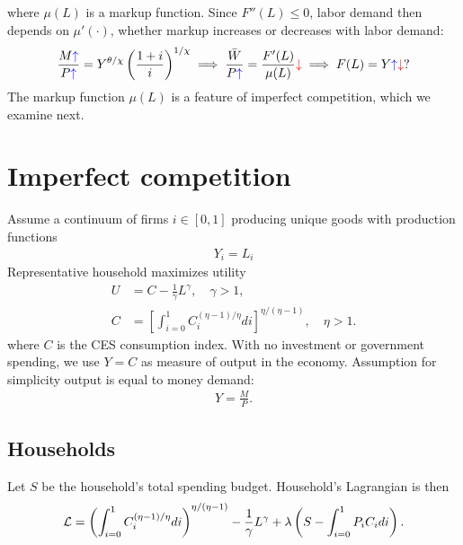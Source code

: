 \documentclass[../main.tex]{subfiles}
\begin{document}
        where $\mu(L)$ is a markup function. Since $F''(L) \le 0$, labor demand then depends on $\mu'(\cdot)$, whether markup increases or decreases with labor demand:
        \begin{align}
            \frac{M \textcolor{blue}{\uparrow}}{P \textcolor{blue}{\uparrow}} = Y^{\theta/\chi} \left(\frac{1+i}{i}\right)^{1/\chi}
            \implies
            \frac{\bar W}{P \textcolor{blue}{\uparrow}}
            = \frac{F'(L)}{\mu(L)} \textcolor{red}{\downarrow}
            \implies
            F(L) = Y \textcolor{blue}{\uparrow} \textcolor{red}{\downarrow} ?
        \end{align}
        The markup function $\mu(L)$ is a feature of imperfect competition, which we examine next.
        
    
    \section{Imperfect competition}
        
        Assume a continuum of firms $i \in [0, 1]$ producing unique goods with production functions
        \begin{align}
            Y_{i} = L_{i}
            \label{eqn:imperfect-prod-fn}
        \end{align}
        Representative household maximizes utility
        \begin{align}
            U &= C - \frac{1}{\gamma} L^{\gamma}, \quad \gamma > 1,
            \\
            C &= \left[
                \int_{i=0}^1 C_i^{(\eta - 1)/\eta} di
            \right]^{\eta / (\eta - 1)},
            \quad \eta > 1.
            \label{eqn:impcomp-consumption-utility}
        \end{align}
        where $C$ is the CES consumption index. With no investment or government spending, we use $Y = C$ as measure of output in the economy. Assumption for simplicity output is equal to money demand:
        \begin{align}
            Y = \frac{M}{P}.
        \end{align}
        
    \subsection{Households}
        
        Let $S$ be the household's total spending budget. Household's Lagrangian is then
        \begin{align}
            \mathcal{L} = \left(
                    \int_{i=0}^1 C_i^{(\eta - 1)/\eta} di
                \right)^{\eta / (\eta - 1)}
            - \frac{1}{\gamma} L^{\gamma}
            +\lambda \left(
                S - \int_{i=0}^1 P_i C_i di
            \right).
        \end{align}
        
\end{document}
